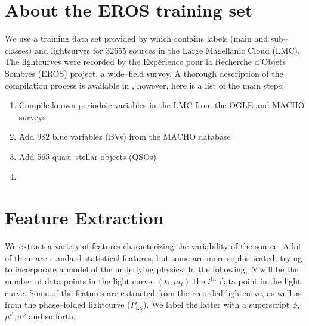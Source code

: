 \section{About the EROS training set}

We use a training data set provided by \citet{kim2014} which contains labels (main and sub--classes) and lightcurves for $32655$ sources in the Large Magellanic Cloud (LMC). The lightcurves were recorded by the Expérience pour la Recherche d’Objets Sombres (EROS) project, a wide--field survey. A thorough description of the compilation process is available in \citet{kim2014}, however, here is a list of the main steps:

\begin{enumerate}
\item Compile known periodoic variables in the LMC from the OGLE and MACHO surveys
\item Add $982$ blue variables (BVs) from the MACHO database
\item Add 565 quasi--stellar objects (QSOs)
\item 
\end{enumerate}


\section{Feature Extraction}

We extract a variety of features characterizing the variability of the source. A lot of them are standard statistical features, but some are more sophisticated, trying to incorporate a model of the underlying physics. In the following, $N$ will be the number of data points in the light curve, $(t_i, m_i)$ the $i^{\text{th}}$ data point in the light curve. Some of the features are extracted from the recorded lightcurve, as well as from the phase--folded lightcurve ($P_{\text{LS}}$). We label the latter with a superscript $\phi$, \eg $\mu^\phi, \sigma^\phi$ and so forth.


